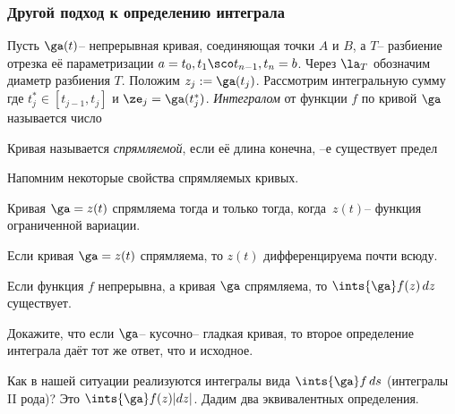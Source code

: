 \documentclass[a4paper]{article}
\begin{document}
\subsubsection{Другой подход к определению интеграла}

\begin{df}
Пусть $\ga(t)$-- непрерывная кривая, соединяющая точки $A$ и $B$, а $T$-- разбиение отрезка её
параметризации $a=t_0, t_1 \sco t_{n-1}, t_n=b$. Через $\la_T$ обозначим диаметр разбиения $T$.
Положим $z_j := \ga(t_j)$. Рассмотрим интегральную сумму
где $t^*_j\in [t_{j-1}, t_j]$ и $\ze_j = \ga(t^*_j)$. \emph{Интегралом} от функции $f$ по кривой $\ga$ называется число
\end{df}

\begin{df}
Кривая называется \emph{спрямляемой}, если её длина конечна, --е существует предел
\end{df}

Напомним некоторые свойства спрямляемых кривых.
\begin{theorem}
Кривая $\ga = z(t)$ спрямляема тогда и только тогда, когда~$z(t)$-- функция ограниченной вариации.
\end{theorem}

\begin{theorem}
Если кривая $\ga=z(t)$ спрямляема, то $z(t)$ дифференцируема почти всюду.
\end{theorem}

\begin{stm}
Если функция $f$ непрерывна, а кривая $\ga$ спрямляема, то $\ints{\ga}f(z)\,dz$ существует.
\end{stm}

\begin{problem}
Докажите, что если $\ga$-- кусочно-- гладкая кривая, то второе определение интеграла даёт тот же ответ, что и исходное.
\end{problem}

Как в нашей ситуации реализуются интегралы вида $\ints{\ga}f\,ds$ (интегралы  II рода)? Это
$\ints{\ga}f(z)|dz|$. Дадим два эквивалентных определения.

\begin{df}
\end{df}
\end{document}
